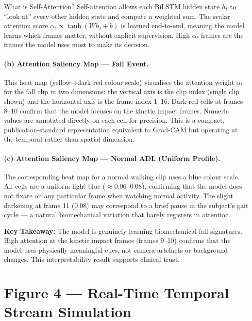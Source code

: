 \documentclass[12pt,a4paper]{article}
\begin{document}
\begin{keybox}{What is Self-Attention?}
Self-attention allows each BiLSTM hidden state $h_t$ to ``look at'' every other hidden state and compute a weighted sum. The scalar attention score $\alpha_t \propto \tanh(W h_t + b)$ is learned end-to-end, meaning the model learns which frames matter, without explicit supervision. High $\alpha_t$ frames are the frames the model uses most to make its decision.
\end{keybox}

\paragraph{(b) Attention Saliency Map — Fall Event.}
This heat map (yellow→dark red colour scale) visualises the attention weight $\alpha_t$ for the fall clip in two dimensions: the vertical axis is the clip index (single clip shown) and the horizontal axis is the frame index 1–16. Dark red cells at frames 8–10 confirm that the model focuses on the kinetic impact frames. Numeric values are annotated directly on each cell for precision. This is a compact, publication-standard representation equivalent to Grad-CAM but operating at the temporal rather than spatial dimension.

\paragraph{(c) Attention Saliency Map — Normal ADL (Uniform Profile).}
The corresponding heat map for a normal walking clip uses a blue colour scale. All cells are a uniform light blue ($\approx$0.06–0.08), confirming that the model does not fixate on any particular frame when watching normal activity. The slight darkening at frame 11 (0.08) may correspond to a brief pause in the subject's gait cycle — a natural biomechanical variation that barely registers in attention.

\begin{resultbox}
\textbf{Key Takeaway:} The model is genuinely learning biomechanical fall signatures. High attention at the kinetic impact frames (frames 9–10) confirms that the model uses physically meaningful cues, not camera artefacts or background changes. This interpretability result supports clinical trust.
\end{resultbox}

\clearpage

\section{Figure 4 — Real-Time Temporal Stream Simulation}
\end{document}
